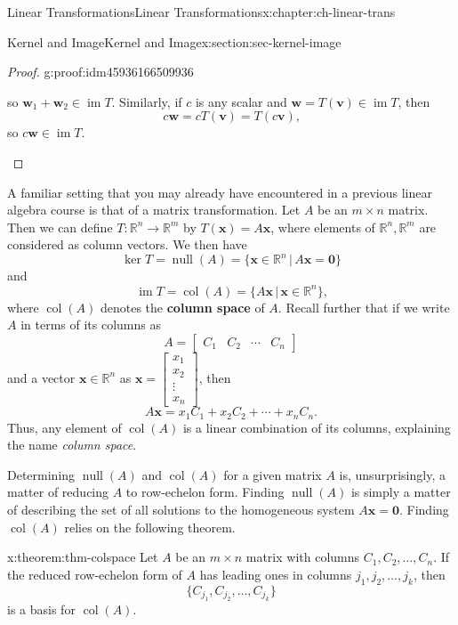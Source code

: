 \documentclass[oneside,10pt,]{book}
\newcommand{\terminology}[1]{\textbf{#1}}
\numberwithin{equation}{section}
\newcommand{\bbm}{\begin{bmatrix}}
\newcommand{\ebm}{\end{bmatrix}}
\newcommand{\R}{\mathbb{R}}
\newcommand{\im}{\operatorname{im}}
\newcommand{\nll}{\operatorname{null}}
\newcommand{\csp}{\operatorname{col}}
\newcommand{\vv}{\mathbf{v}}
\newcommand{\ww}{\mathbf{w}}
\newcommand{\xx}{\mathbf{x}}
\newcommand{\amp}{&}
\begin{document}
\begin{chapterptx}{Linear Transformations}{}{Linear Transformations}{}{}{x:chapter:ch-linear-trans}
\begin{sectionptx}{Kernel and Image}{}{Kernel and Image}{}{}{x:section:sec-kernel-image}
\begin{proof}{}{g:proof:idm45936166509936}
\begin{enumerate}
so \(\ww_1+\ww_2\in \im T\). Similarly, if \(c\) is any scalar and \(\ww=T(\vv)\in\im T\), then%
\begin{equation*}
c\ww=cT(\vv)=T(c\vv)\text{,}
\end{equation*}
so \(c\ww\in \im T\).%
\end{enumerate}
%
\end{proof}
A familiar setting that you may already have encountered in a previous linear algebra course is that of a matrix transformation. Let \(A\) be an \(m\times n\) matrix. Then we can define \(T:\R^n\to \R^m\) by \(T(\xx)=A\xx\), where elements of \(\R^n,\R^m\) are considered as column vectors. We then have%
\begin{equation*}
\ker T = \nll(A) = \{\xx\in \R^n \,|\, A\xx=\mathbf{0}\}
\end{equation*}
and%
\begin{equation*}
\im T = \csp(A) = \{A\xx\,|\, \xx\in \R^n\}\text{,}
\end{equation*}
where \(\csp(A)\) denotes the \terminology{column space} of \(A\). Recall further that if we write \(A\) in terms of its columns as%
\begin{equation*}
A = \bbm C_1 \amp C_2 \amp \cdots \amp C_n\ebm
\end{equation*}
and a vector \(\xx\in \R^n\) as \(\xx=\bbm x_1\\x_2\\\vdots \\x_n\ebm\), then%
\begin{equation*}
A\xx = x_1C_1+x_2C_2+\cdots +x_nC_n\text{.}
\end{equation*}
Thus, any element of \(\csp(A)\) is a linear combination of its columns, explaining the name \emph{column space}.%
\par
Determining \(\nll(A)\) and \(\csp(A)\) for a given matrix \(A\) is, unsurprisingly, a matter of reducing \(A\) to row-echelon form. Finding \(\nll(A)\) is simply a matter of describing the set of all solutions to the homogeneous system \(A\xx=\mathbf{0}\). Finding \(\csp(A)\) relies on the following theorem.%
\begin{theorem}{}{}{x:theorem:thm-colspace}%
Let \(A\) be an \(m\times n\) matrix with columns \(C_1,C_2,\ldots, C_n\). If the reduced row-echelon form of \(A\) has leading ones in columns \(j_1,j_2,\ldots, j_k\), then%
\begin{equation*}
\{C_{j_1},C_{j_2},\ldots, C_{j_k}\}
\end{equation*}
is a basis for \(\csp(A)\).%
\end{theorem}

\end{sectionptx}
\end{chapterptx}
\end{document}
